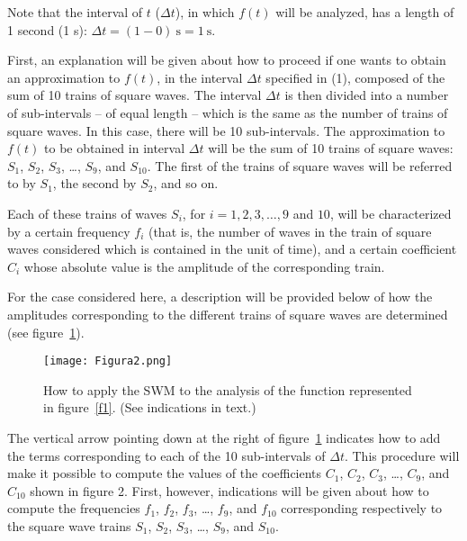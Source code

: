 \documentclass[11pt]{rMTA2010} \usepackage[utf8]{inputenc} \usepackage{graphicx} \usepackage{booktabs} \usepackage{array} \usepackage{enumerate}
\begin{document}
Note that the interval of $t$ ($\Delta t$), in which $f(t)$ will be analyzed, has a length of 1 second (1 s): $\Delta t = (1 - 0)\:\mathrm{s} = 1 \:\mathrm{s}$.

First, an explanation will be given about how to proceed if one wants to obtain an approximation to $f(t)$, in the interval $\Delta t$ specified in (1), composed of the sum of 10 trains of square waves. The interval $\Delta t$ is then divided into a number of sub-intervals -- of equal length -- which is the same as the number of trains of square waves. In this case, there will be 10 sub-intervals. The approximation to $f(t)$ to be obtained in interval $\Delta t$ will be the sum of 10 trains of square waves: $S_1$, $S_2$, $S_3$, \ldots, $S_9$, and $S_{10}$. The first of the trains of square waves will be referred to by $S_1$, the second by $S_2$, and so on.

Each of these trains of waves $S_i$, for $i = 1, 2, 3, \ldots, 9$ and $10$, will be characterized by a certain frequency $f_i$ (that is, the number of waves in the train of square waves considered which is contained in the unit of time), and a certain coefficient  $C_i$ whose absolute value is the amplitude of the corresponding train.

For the case considered here, a description will be provided below of how the amplitudes corresponding to the different trains of square waves are determined (see figure~\ref{f2}).

\begin{figure}[H]
\centering
\texttt{[image: Figura2.png]}
\caption{How to apply the SWM to the analysis of the function represented in figure~\ref{f1}. (See indications in text.)}
\label{f2}
\end{figure}

The vertical arrow pointing down at the right of figure~\ref{f2} indicates how to add the terms corresponding to each of the 10 sub-intervals of $\Delta t$.  This procedure will make it possible to compute the values of the coefficients $C_1$, $C_2$, $C_3$, \ldots, $C_9$, and $C_{10}$ shown in figure 2. First, however, indications will be given about how to compute the frequencies $f_1$, $f_2$, $f_3$, \ldots, $f_9$, and $f_{10}$ corresponding respectively to the square wave trains $S_1$, $S_2$, $S_3$, \ldots, $S_9$, and $S_{10}$.
\end{document}
